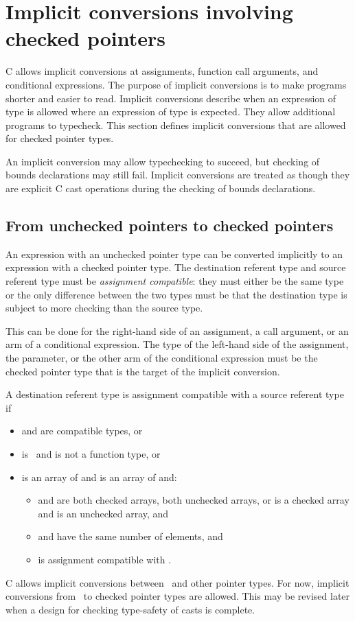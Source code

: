 \section{Implicit conversions involving checked pointers}
\label{section:implicit-conversions}

C allows implicit conversions at assignments, function call arguments,
and conditional expressions.  The purpose of
implicit conversions is to make programs shorter and easier to
read.  Implicit conversions describe when an expression of type
 is allowed where an expression of type  is expected.
They allow additional programs to typecheck.
This section defines implicit conversions that are allowed for checked
pointer types.

An implicit conversion may allow typechecking to succeed, but
checking of bounds declarations may still fail.  Implicit
conversions are treated as though they are explicit C cast
operations during the checking of bounds declarations.

\subsection{From unchecked pointers to checked pointers}
An expression with an unchecked pointer type can be converted implicitly to an
expression with a checked pointer type.   The destination referent type
and source referent type must be {\em assignment compatible}: they must
either be the same type or the only difference between the two types must be that
the destination type is subject to more checking than the source type.

This can be done for the right-hand side of an assignment, a call argument,
or an arm of a conditional expression.
The type of the left-hand side of the assignment, the parameter, or the other 
arm of the conditional expression must be the checked pointer type that is the
target of the implicit conversion.

A destination referent type  is assignment compatible with a source referent
type  if
\begin{itemize}
\item {} and  are compatible types, or
\item {} is \void\ and  is not a function type, or
\item {} is an array of  and  is an array of 
and:
\begin{itemize}
\item {} and  are both checked arrays, both unchecked arrays, or
 is a checked array and  is an unchecked array, and
\item {} and  have the same number of elements, and
\item {} is assignment compatible with .
\end{itemize}
\end{itemize}
C allows implicit conversions between \uncheckedptrvoid\ and other pointer
types. For now, implicit conversions from \uncheckedptrvoid\ to checked pointer
types are allowed. This may be revised later when a design
for checking type-safety of casts is complete.

